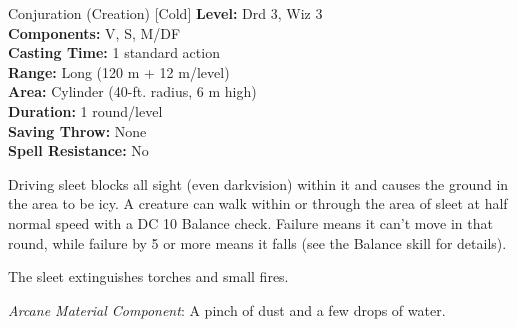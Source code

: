 {Conjuration (Creation) [Cold]}
{
	\textbf{Level:}
	Drd 3, Wiz 3\\
	\textbf{Components:}
	V, S, M/DF\\
	\textbf{Casting Time:}
	1 standard action\\
	\textbf{Range:}
	Long (120 m + 12 m/level)\\
	\textbf{Area:}
	Cylinder (40-ft. radius, 6 m high)\\
	\textbf{Duration:}
	1 round/level\\
	\textbf{Saving Throw:}
	None\\
	\textbf{Spell Resistance:}
	No\\
}
{
	Driving sleet blocks all sight (even darkvision) within it and causes the ground in the area to be icy. A creature can walk within or through the area of sleet at half normal speed with a DC 10 Balance check. Failure means it can't move in that round, while failure by 5 or more means it falls (see the Balance skill for details).

	The sleet extinguishes torches and small fires.

	\textit{Arcane Material Component}:
	A pinch of dust and a few drops of water.

}
